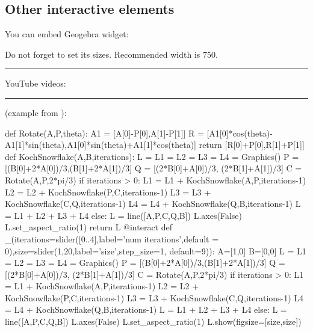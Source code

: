 \documentclass{ximera}
\begin{document}
\subsection*{Other interactive elements}


You can embed Geogebra widget:


Do not forget to set its sizes.
Recommended width is 750.

\noindent\rule{12cm}{0.4pt}

YouTube videos: 

\noindent\rule{12cm}{0.4pt}

 (example from ):

\begin{sageCell}
def Rotate(A,P,theta):
    A1 = [A[0]-P[0],A[1]-P[1]]
    R = [A1[0]*cos(theta)-A1[1]*sin(theta),A1[0]*sin(theta)+A1[1]*cos(theta)]
    return [R[0]+P[0],R[1]+P[1]]
def KochSnowflake(A,B,iterations):
    L = L1 = L2 = L3 = L4 = Graphics()
    P = [(B[0]+2*A[0])/3,(B[1]+2*A[1])/3]
    Q = [(2*B[0]+A[0])/3, (2*B[1]+A[1])/3]
    C = Rotate(A,P,2*pi/3)
    if iterations > 0:
        L1 = L1 + KochSnowflake(A,P,iterations-1)
        L2 = L2 + KochSnowflake(P,C,iterations-1)
        L3 = L3 + KochSnowflake(C,Q,iterations-1)
        L4 = L4 + KochSnowflake(Q,B,iterations-1)
        L = L1 + L2 + L3 + L4
    else:
        L = line([A,P,C,Q,B])
    L.axes(False)
    L.set_aspect_ratio(1)
    return L
@interact
def _(iterations=slider([0..4],label='num iterations',default = 0),size=slider(1,20,label='size',step_size=1, default=9)):
    A=[1,0]
    B=[0,0]
    L = L1 = L2 = L3 = L4 = Graphics()
    P = [(B[0]+2*A[0])/3,(B[1]+2*A[1])/3]
    Q = [(2*B[0]+A[0])/3, (2*B[1]+A[1])/3]
    C = Rotate(A,P,2*pi/3)
    if iterations > 0:
        L1 = L1 + KochSnowflake(A,P,iterations-1)
        L2 = L2 + KochSnowflake(P,C,iterations-1)
        L3 = L3 + KochSnowflake(C,Q,iterations-1)
        L4 = L4 + KochSnowflake(Q,B,iterations-1)
        L = L1 + L2 + L3 + L4
    else:
        L = line([A,P,C,Q,B])
    L.axes(False)
    L.set_aspect_ratio(1)
    L.show(figsize=[size,size])
    
\end{sageCell}
\end{document}

